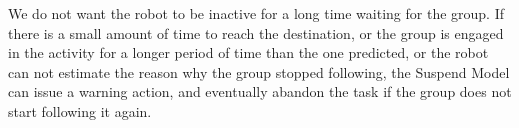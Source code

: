 We do not want the robot to be inactive for a long time  waiting for the group. If there is a small amount of time to reach the destination, or the group is engaged in the activity for a longer period of time than the one predicted, or the robot can not estimate the reason why the group stopped following, the Suspend Model can issue a warning action, and eventually abandon the task if the group does not start following it again.

